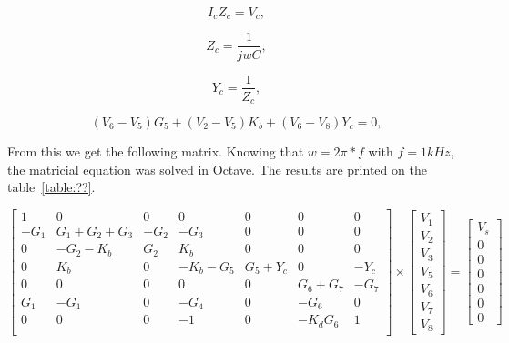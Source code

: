 \begin{equation}
  I_{c}Z_{c} = V_{c},
  \label{eq:caphasor1}
\end{equation}

\begin{equation}
  Z_{c} = \frac{1}{jwC},
  \label{eq:impedancecap}
\end{equation}

\begin{equation}
 Y_{c} = \frac{1}{Z_c},
  \label{eq:caphasor2}
\end{equation}

\begin{equation}
   (V_{6} - V_{5})G_{5} + (V_{2} - V_{5})K_{b} + (V_{6} - V_{8})Y_{c} = 0,
  \label{eq:node67}
\end{equation}

From this we get the following matrix. Knowing that $w = 2\pi*f$ with $f = 1kHz$, the matricial equation was solved in Octave. The results are printed on the table~\ref{table:??}.

\begin{equation}
\left[ \begin{array}{ccccccc} 
		1 & 0 & 0 & 0 & 0 & 0 & 0 \\ 
		-G_1 & G_1+G_2+G_3 & -G_2 & -G_3 & 0 & 0 & 0 \\
		0 & -G_2-K_b & G_2 & K_b & 0 & 0 & 0 \\ 
		0 & K_b & 0 & -K_b-G_5 & G_5+Y_c & 0 & -Y_c  \\ 
		0 & 0 & 0 & 0 & 0 & G_6+G_7 & -G_7  \\ 
		G_1 & -G_1 & 0 & -G_4 & 0 & -G_6 & 0  \\ 
		0 & 0 & 0 & -1 & 0 & -K_dG_6 & 1 \\ 

\end{array} \right]
\times \left[ \begin{array}{c} V_1 \\ V_2 \\ V_3 \\  V_5 \\ V_6 \\ V_7 \\ V_8 \end{array} \right] =
\left[ \begin{array}{c} V_s \\ 0 \\ 0 \\ 0 \\ 0 \\ 0 \\ 0  \end{array} \right]
\label{eq:nodalmatrix4}
\end{equation}

